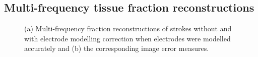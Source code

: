 \subsection{Multi-frequency tissue fraction reconstructions}



\begin{figure}[htbp]
\centering
	\hfil
\caption{(a) Multi-frequency fraction reconstructions of strokes without and with electrode modelling correction when electrodes were modelled accurately and (b) the corresponding image error measures.}
\end{figure}
